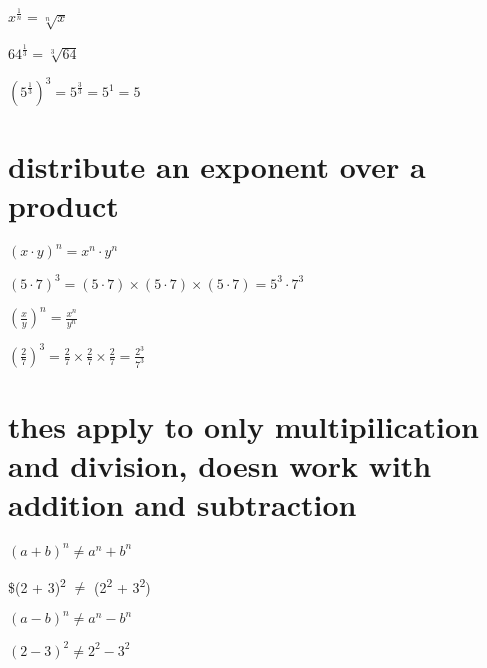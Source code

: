 \documentclass[11pt]{article}
\begin{document}
\(x^{\frac{1}{n}} = \sqrt[n]{x}\)

\(64^{\frac{1}{3}} = \sqrt[3]{64}\)

\((5^{\frac{1}{3}})^3 = 5^{\frac{3}{3}} = 5^1 = 5\)

\section{distribute an exponent over a product}
\label{sec:orgd6cf1d2}

\((x \cdot y)^n = x^n \cdot y^n\)

\((5 \cdot 7)^3 = (5 \cdot 7) \times (5 \cdot 7) \times (5 \cdot 7) = 5^3 \cdot 7^3\)

\((\frac{x}{y})^n = \frac{x^n}{y^n}\)

\((\frac{2}{7})^3 = \frac{2}{7} \times \frac{2}{7} \times \frac{2}{7} = \frac{2^3}{7^3}\)

\section{thes apply to only multipilication and division, doesn work with addition and subtraction}
\label{sec:org7694abe}

\((a + b)^n \neq a^n + b^n\)

\$(2 + 3)\textsuperscript{2} \(\neq\) (2\textsuperscript{2} + 3\textsuperscript{2})

\((a - b)^n \neq a^n - b^n\)

\((2 - 3)^2 \neq 2^2 - 3^2\)
\end{document}
